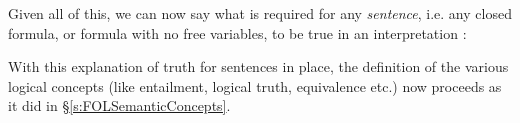 Given all of this, we can now say what is required for any \emph{sentence}, i.e. any closed formula, or formula with no free variables, to be true in an interpretation :

With this explanation of truth for sentences in place, the definition of the various logical concepts (like entailment, logical truth, equivalence etc.) now proceeds as it did in \S\ref{s:FOLSemanticConcepts}.



